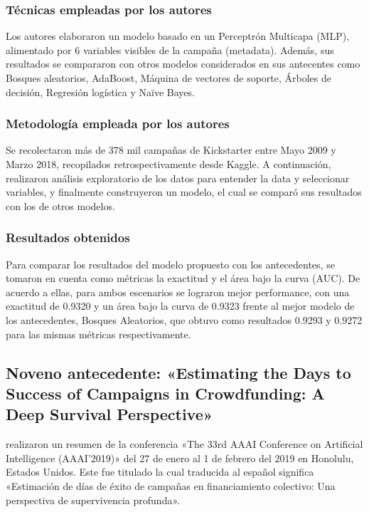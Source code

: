 \subsubsection{Técnicas empleadas por los autores}
Los autores elaboraron un modelo basado en un Perceptrón Multicapa (MLP), alimentado por 6 variables visibles de la campaña (metadata). Además, sus resultados se compararon con otros modelos considerados en sus antecentes como Bosques aleatorios, AdaBoost, Máquina de vectores de soporte, Árboles de decisión, Regresión logística y Naïve Bayes.

\subsubsection{Metodología empleada por los autores}
Se recolectaron más de 378 mil campañas de Kickstarter entre Mayo 2009 y Marzo 2018, recopilados retrospectivamente desde Kaggle. A continuación, realizaron análisis exploratorio de los datos para entender la data y seleccionar variables, y finalmente construyeron un modelo, el cual se comparó sus resultados con los de otros modelos.

\subsubsection{Resultados obtenidos}
Para comparar los resultados del modelo propuesto con los antecedentes, se tomaron en cuenta como métricas la exactitud y el área bajo la curva (AUC). De acuerdo a ellas, para ambos escenarios se lograron mejor performance, con una exactitud de 0.9320 y un área bajo la curva de 0.9323 frente al mejor modelo de los antecedentes, Bosques Aleatorios, que obtuvo como resultados 0.9293 y 0.9272 para las mismas métricas respectivamente.

\subsection{Noveno antecedente: «Estimating the Days to Success of Campaigns in Crowdfunding: A Deep Survival Perspective» \citep*{pr_jin2019dayssuccess}}
\citeauthor{pr_jin2019dayssuccess} realizaron un resumen de la conferencia «The 33rd AAAI Conference on Artificial Intelligence (AAAI'2019)» del 27 de enero al 1 de febrero del 2019 en Honolulu, Estados Unidos. Este fue titulado  la cual traducida al español significa «Estimación de días de éxito de campañas en financiamiento colectivo: Una perspectiva de supervivencia profunda».

